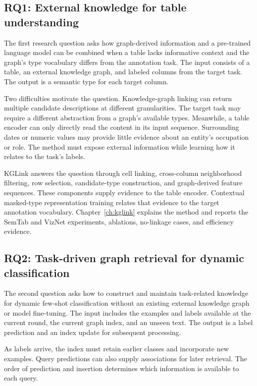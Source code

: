 \subsection{RQ1: External knowledge for table understanding}
The first research question asks how graph-derived information and a pre-trained language model can be combined when a table lacks informative context and the graph's type vocabulary differs from the annotation task. The input consists of a table, an external knowledge graph, and labeled columns from the target task. The output is a semantic type for each target column.

Two difficulties motivate the question. Knowledge-graph linking can return multiple candidate descriptions at different granularities. The target task may require a different abstraction from a graph's available types. Meanwhile, a table encoder can only directly read the content in its input sequence. Surrounding dates or numeric values may provide little evidence about an entity's occupation or role. The method must expose external information while learning how it relates to the task's labels.

KGLink answers the question through cell linking, cross-column neighborhood filtering, row selection, candidate-type construction, and graph-derived feature sequences. These components supply evidence to the table encoder. Contextual masked-type representation training relates that evidence to the target annotation vocabulary. Chapter~\ref{ch:kglink} explains the method and reports the SemTab and VizNet experiments, ablations, no-linkage cases, and efficiency evidence.

\subsection{RQ2: Task-driven graph retrieval for dynamic classification}
The second question asks how to construct and maintain task-related knowledge for dynamic few-shot classification without an existing external knowledge graph or model fine-tuning. The input includes the examples and labels available at the current round, the current graph index, and an unseen text. The output is a label prediction and an index update for subsequent processing.

As labels arrive, the index must retain earlier classes and incorporate new examples. Query predictions can also supply associations for later retrieval. The order of prediction and insertion determines which information is available to each query.

